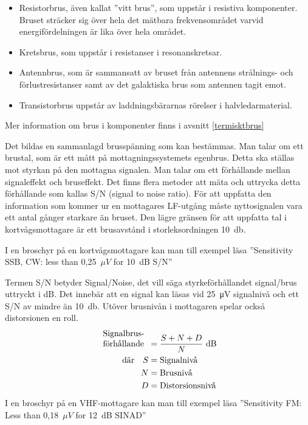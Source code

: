 \begin{itemize}
\item Resistorbrus, även kallat ''vitt brus'', som uppstår i resistiva
  komponenter.
  Bruset sträcker sig över hela det mätbara frekvensområdet varvid
  energifördelningen är lika över hela området.

\item Kretsbrus, som uppstår i resistanser i resonanskretsar.

\item Antennbrus, som är sammansatt av bruset från antennens
  strålnings- och förlustresistanser samt av det galaktiska brus som
  antennen tagit emot.

\item Transistorbrus uppstår av laddningsbärarnas rörelser i
  halvledarmaterial.
\end{itemize}

Mer information om brus i komponenter finns i avsnitt \ref{termisktbrus}

Det bildas en sammanlagd brusspänning som kan bestämmas.
Man talar om ett brustal, som är ett mått på mottagningssystemets egenbrus.
Detta ska ställas mot styrkan på den mottagna signalen.
Man talar om ett förhållande mellan signaleffekt och bruseffekt.
Det finns flera metoder att mäta och uttrycka detta förhållande som kallas
S/N (signal to noise ratio).
För att uppfatta den information som kommer ur en mottagares LF-utgång måste
nyttosignalen vara ett antal gånger starkare än bruset.
Den lägre gränsen för att uppfatta tal i kortvågsmottagare är ett brusavstånd
i storleksordningen \SI{10}{\decibel}.



I en broschyr på en kortvågsmottagare kan man till exempel läsa
''Sensitivity SSB, CW: less than 0,25~\(\mu V\) for 10~dB S/N''

Termen S/N betyder Signal/Noise, det vill säga styrkeförhållandet signal/brus
uttryckt i dB.
Det innebär att en signal kan läsas vid \SI{25}{\micro\volt} signalnivå och ett
S/N av mindre än \SI{10}{\decibel}.
Utöver brusnivån i mottagaren spelar också distorsionen en roll.
\begin{align*}
  \begin{array}[b]{l}
    \text{Signalbrus-} \\
    \text{förhållande}
  \end{array} &= \frac{S + N + D}{N} \text{ dB} \\
  \text{där} \quad S &= \text{Signalnivå} \\
  N &= \text{Brusnivå} \\
  D &= \text{Distorsionsnivå} \\
\end{align*}
I en broschyr på en VHF-mottagare kan man till exempel läsa
''Sensitivity FM: Less than 0,18~\(\mu V\) for 12~dB SINAD''

